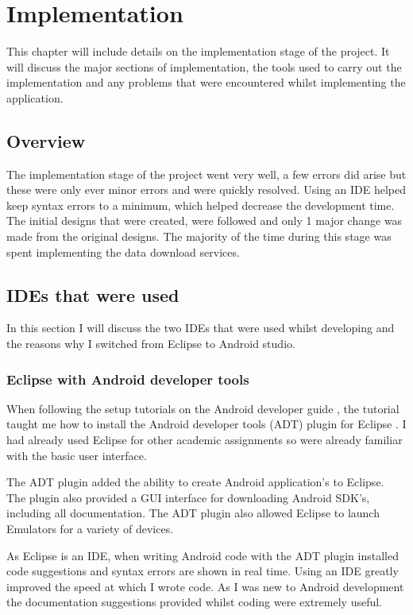 \chapter{Implementation}

This chapter will include details on the implementation stage of the project. It will discuss the major sections of implementation, the tools used to carry out the implementation and any problems that were encountered whilst implementing the application.

\section{Overview}

The implementation stage of the project went very well, a few errors did arise but these were only ever minor errors and were quickly resolved. Using an IDE helped keep syntax errors to a minimum, which helped decrease the development time. The initial designs that were created, were followed and only 1 major change was made from the original designs. The majority of the time during this stage was spent implementing the data download services.

\section{IDEs that were used}

In this section I will discuss the two IDEs that were used whilst developing and the reasons why I switched from Eclipse to Android studio.

\subsection{Eclipse with Android developer tools}

When following the setup tutorials on the Android developer guide \cite{android_sdk}, the tutorial taught me how to install the Android developer tools (ADT) plugin for Eclipse \cite{eclipse}. I had already used Eclipse for other academic assignments so were already familiar with the basic user interface. 

The ADT plugin added the ability to create Android application’s to Eclipse. The plugin also provided a GUI interface for downloading Android SDK’s, including all documentation. The ADT plugin also allowed Eclipse to launch Emulators for a variety of devices.

As Eclipse is an IDE, when writing Android code with the ADT plugin installed code suggestions and syntax errors are shown in real time. Using an IDE greatly improved the speed at which I wrote code. As I was new to Android development the documentation suggestions provided whilst coding were extremely useful.

